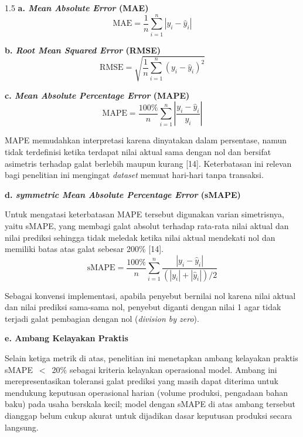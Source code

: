 \documentclass[12pt, a4paper, onecolumn, oneside]{report}
\begin{document}
\begin{spacing}{1.5}
\noindent\textbf{a. \textit{Mean Absolute Error} (MAE)}
\begin{equation}
    \text{MAE} = \frac{1}{n}\sum_{i=1}^{n} |y_i - \hat{y}_i|
    \label{eq:mae}
\end{equation}

\noindent\textbf{b. \textit{Root Mean Squared Error} (RMSE)}
\begin{equation}
    \text{RMSE} = \sqrt{\frac{1}{n}\sum_{i=1}^{n} (y_i - \hat{y}_i)^2}
    \label{eq:rmse}
\end{equation}

\noindent\textbf{c. \textit{Mean Absolute Percentage Error} (MAPE)}
\begin{equation}
    \text{MAPE} = \frac{100\%}{n}\sum_{i=1}^{n} \left| \frac{y_i - \hat{y}_i}{y_i} \right|
\end{equation}

MAPE memudahkan interpretasi karena dinyatakan dalam persentase, namun tidak terdefinisi ketika terdapat nilai aktual sama dengan nol dan bersifat asimetris terhadap galat berlebih maupun kurang [14]. Keterbatasan ini relevan bagi penelitian ini mengingat \textit{dataset} memuat hari-hari tanpa transaksi.

\noindent\textbf{d. \textit{symmetric Mean Absolute Percentage Error} (sMAPE)}

Untuk mengatasi keterbatasan MAPE tersebut digunakan varian simetrisnya, yaitu sMAPE, yang membagi galat absolut terhadap rata-rata nilai aktual dan nilai prediksi sehingga tidak meledak ketika nilai aktual mendekati nol dan memiliki batas atas galat sebesar 200\% [14].
\begin{equation}
    \text{sMAPE} = \frac{100\%}{n}\sum_{i=1}^{n} \frac{|y_i - \hat{y}_i|}{(|y_i| + |\hat{y}_i|)/2}
    \label{eq:smape}
\end{equation}

Sebagai konvensi implementasi, apabila penyebut bernilai nol karena nilai aktual dan nilai prediksi sama-sama nol, penyebut diganti dengan nilai 1 agar tidak terjadi galat pembagian dengan nol (\textit{division by zero}).

\noindent\textbf{e. Ambang Kelayakan Praktis}

Selain ketiga metrik di atas, penelitian ini menetapkan ambang kelayakan praktis sMAPE~$<$~20\% sebagai kriteria kelayakan operasional model. Ambang ini merepresentasikan toleransi galat prediksi yang masih dapat diterima untuk mendukung keputusan operasional harian (volume produksi, pengadaan bahan baku) pada usaha berskala kecil; model dengan sMAPE di atas ambang tersebut dianggap belum cukup akurat untuk dijadikan dasar keputusan produksi secara langsung.


\end{spacing}
\end{document}

